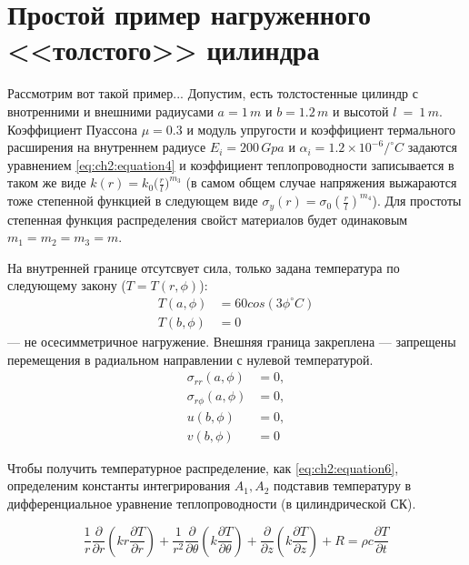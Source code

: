 \chapter{Простой пример нагруженного <<толстого>> цилиндра} \label{ch:example1}

Рассмотрим вот такой пример...
Допустим, есть толстостенные цилиндр с внотренними и внешними радиусами \(a=1\,m\) и \(b=1.2\,m\) и высотой \(l~=~1\,m\). Коэффициент Пуассона \(\mu=0.3\) и модуль упругости и коэффициент термального расширения на внутреннем радиусе \(E_i = 200\,Gpa\) и \(\alpha_i = 1.2 \times 10^{-6} /^{\circ}C\) задаются уравнением \cref{eq:ch2:equation4} и коэффициент теплопроводности записывается в таком же виде \( k(r) = k_0 \big ( \frac{r}{l} \big ) ^ {m_3} \) (в самом общем случае напряжения выжараются тоже степенной функцией в следующем виде \(\sigma_y(r) = \sigma_0 (\frac{r}{l})^{m_4}\)). Для простоты степенная функция распределения свойст материалов будет одинаковым \(m_1=m_2=m_3=m\).

На внутренней границе отсутсвует сила, только задана температура по следующему закону (\(T = T(r, \phi)\)):
\begin{equation}
\label{eq:example1:1}
\begin{split}
	T(a, \phi) &= 60 cos (3\phi^{\circ}C) \\
	T(b, \phi) &= 0
\end{split}
\end{equation}
 --- не осесимметричное нагружение. Внешняя граница закреплена --- запрещены перемещения в радиальном направлении с нулевой температурой. 
\begin{equation}
\label{eq:example1:2}
\begin{split}
	\sigma_{rr}(a, \phi) &= 0,\\
	\sigma_{r\phi}(a, \phi) &= 0,\\
	u(b, \phi) &= 0,\\
	v(b, \phi) &= 0
\end{split}
\end{equation}

Чтобы получить температурное распределение, как \cref{eq:ch2:equation6}, определеним константы интегрирования \(A_1, A_2\) подставив температуру в дифференциальное уравнение теплопроводности (в цилиндрической СК).

\begin{equation}
	\label{eq:example1:3}
	\frac{1}{r} \frac{\partial}{\partial r} \left (k r \frac{\partial T}{\partial r} \right) + \frac{1}{r^2} \frac{\partial}{\partial \theta} \left (k \frac{\partial T}{\partial \theta} \right ) + \frac{\partial}{\partial z} \left (k \frac{\partial T}{\partial z} \right) + R = \rho c \frac{\partial T}{\partial t}
\end{equation}





